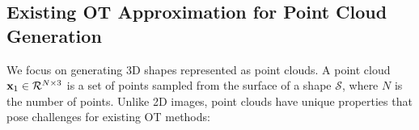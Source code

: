 
\vspace{-2mm}
\subsection{Existing OT Approximation for Point Cloud Generation}
\vspace{-1mm}
\label{subsec:points_challenges}



We focus on generating 3D shapes represented as point clouds. A point cloud ${\mathbf{x}}_1 \in \mathcal{R}^{N \times 3}$ is a set of points sampled from the surface of a shape $\mathcal{S}$, where $N$ is the number of points. Unlike 2D images, point clouds have unique properties that pose challenges for existing OT methods:

